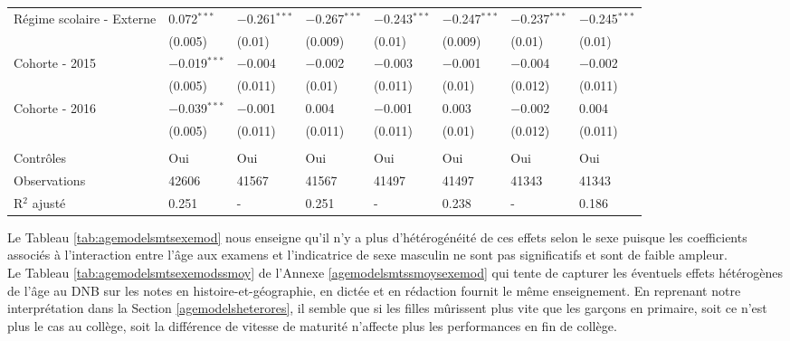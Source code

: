 \documentclass[
]{book}
\begin{document}
\begin{ThreePartTable}
\begin{longtable}[t]{llllllll}
Régime scolaire - Externe & 0.072$^{***}$ & $-$0.261$^{***}$ & $-$0.267$^{***}$ & $-$0.243$^{***}$ & $-$0.247$^{***}$ & $-$0.237$^{***}$ & $-$0.245$^{***}$\\
 & (0.005) & (0.01) & (0.009) & (0.01) & (0.009) & (0.01) & (0.01)\\
Cohorte - 2015 & $-$0.019$^{***}$ & $-$0.004 & $-$0.002 & $-$0.003 & $-$0.001 & $-$0.004 & $-$0.002\\
 & (0.005) & (0.011) & (0.01) & (0.011) & (0.01) & (0.012) & (0.011)\\
Cohorte - 2016 & $-$0.039$^{***}$ & $-$0.001 & 0.004 & $-$0.001 & 0.003 & $-$0.002 & 0.004\\
 & (0.005) & (0.011) & (0.011) & (0.011) & (0.01) & (0.012) & (0.011)\\
 &  &  &  &  &  &  & \\
Contrôles & Oui & Oui & Oui & Oui & Oui & Oui & Oui\\
Observations & 42606 & 41567 & 41567 & 41497 & 41497 & 41343 & 41343\\
R$^2$ ajusté & 0.251 & - & 0.251 & - & 0.238 & - & 0.186\\*
\end{longtable}
\end{ThreePartTable}
\endgroup{}
\newpage

\quad Le Tableau \ref{tab:agemodelsmtsexemod} nous enseigne qu'il n'y a plus d'hétérogénéité de ces effets selon le sexe puisque les coefficients associés à l'interaction entre l'âge aux examens et l'indicatrice de sexe masculin ne sont pas significatifs et sont de faible ampleur.\\
Le Tableau \ref{tab:agemodelsmtsexemodssmoy} de l'Annexe \ref{agemodelsmtssmoysexemod} qui tente de capturer les éventuels effets hétérogènes de l'âge au DNB sur les notes en histoire-et-géographie, en dictée et en rédaction fournit le même enseignement.
En reprenant notre interprétation dans la Section \ref{agemodelsheterores}, il semble que si les filles mûrissent plus vite que les garçons en primaire, soit ce n'est plus le cas au collège, soit la différence de vitesse de maturité n'affecte plus les performances en fin de collège.

\begingroup\fontsize{8}{10}\selectfont
\end{document}
